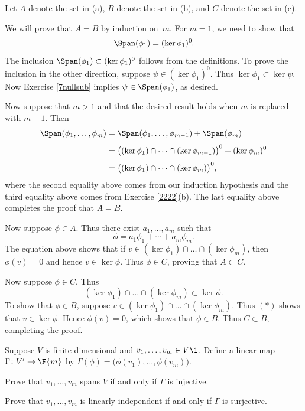 \begin{Solution}
Let $A$ denote the set in (a), $B$ denote the set in (b), and $C$ denote the set in (c).

We will prove that $A = B$ by induction on~$m$. For $m = 1$, we need to show that
\[
\Span(\phi_1) = (\ker \phi_1)^0\!.
\]
The inclusion $\Span(\phi_1) \subset (\ker \phi_1)^0$ follows from the definitions. To prove the inclusion in the other direction, suppose
$\psi \in (\ker \phi_1)^0\!$. Thus $\ker \phi_1 \subset \ker \psi$. Now Exercise \ref{7nullsub} implies $\psi \in \Span(\phi_1)$, as desired.

Now suppose that $m >1$ and that the desired result holds when $m$ is replaced with $m-1$. Then
\begin{align*}
\Span(\phi_1, \dots, \phi_m) &= \Span(\phi_1, \dots, \phi_{m-1}) + \Span(\phi_m) \\[3bp]
&= \bigl( (\ker \phi_1) \cap \dots \cap (\ker \phi_{m-1})\bigr)^0 + (\ker \phi_m)^0 \\[3bp]
&= \bigl( (\ker \phi_1) \cap \dots \cap (\ker \phi_m)\bigr)^0,
\end{align*}
where the second equality above comes from our induction hypothesis and the third equality above comes from Exercise \ref{2222}(b). The last equality above completes the proof that $A = B$.

Now suppose $\phi \in A$. Thus there exist $a_1, \ldots, a_m$ such that
\[
\phi = a_1 \phi_1 + \cdots + a_m \phi_m.
\]
The equation above shows that if $v \in (\ker \phi_1) \cap \dots \cap (\ker \phi_m)$, then $\phi(v) = 0$ and hence $v \in \ker \phi$. Thus $\phi \in C$, proving that
$A \subset C$.

Now suppose $\phi \in C$. Thus
\[ \tag{$(*)$}
(\ker \phi_1) \cap \dots \cap (\ker \phi_m) \subset \ker \phi.
\]
To show that $\phi \in B$, suppose $v \in (\ker \phi_1) \cap \dots \cap (\ker \phi_m)$. Thus $(*)$ shows that $v \in \ker \phi$. Hence $\phi(v) = 0$, which shows that $\phi \in B$. Thus $C \subset B$, completing the proof.
\end{Solution}

\exercise
Suppose $V$ is finite-dimensional and $v_1, \dots, v_m \in V\1$. Define a linear map $\Gamma \colon V' \to \F{m}$ by
$
\Gamma(\phi) = \bigl(\phi(v_1), \dots, \phi(v_m) \bigr)$.
\begin{subtheorem}
\item
Prove that $v_1, \dots, v_m$ spans $V$ if and only if $\Gamma$ is injective.
\item
Prove that $v_1, \dots, v_m$ is linearly independent if and only if $\Gamma$ is surjective.
\end{subtheorem}
\exercisesubtheoremend

